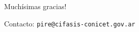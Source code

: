 \documentclass[compress]{beamer}
\begin{document}
\section*{}

\begin{frame}
	\centering
	\Large{Muchísimas gracias!}
	
	
	\vspace{2cm}
	Contacto: {\tt pire@cifasis-conicet.gov.ar}
\end{frame}



\end{document}
